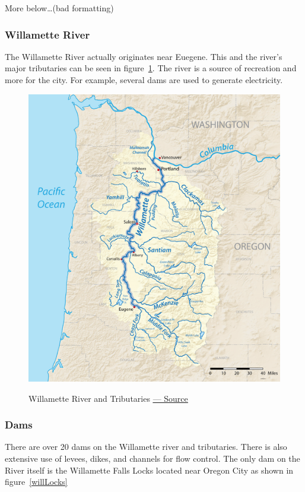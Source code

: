 \documentclass{article}
\begin{document}
More below\ldots (bad formatting)

\newpage

\subsubsection{Willamette River}
The Willamette River actually originates near Euegene. This and the river's major tributaries can be seen in figure~\ref{willRiver}. The river is a source of recreation and more for the city. For example, several dams are used to generate electricity.

\begin{figure}[H]
\centering{}
\caption{Willamette River and Tributaries \href{http://trwc.org/wp-content/uploads/2013/03/Subbasins-entire.jpg}{\underline{--- Source}}}
\includegraphics[width=\textwidth]{willRiverTributaries}\label{willRiver}
\end{figure}

\subsubsection{Dams}
There are over 20 dams on the Willamette river and tributaries. There is also extensive use of levees, dikes, and channels
for flow control. The only dam on the River itself is the Willamette Falls Locks located near Oregon City as shown in 
figure~\ref{willLocks}
\end{document}
